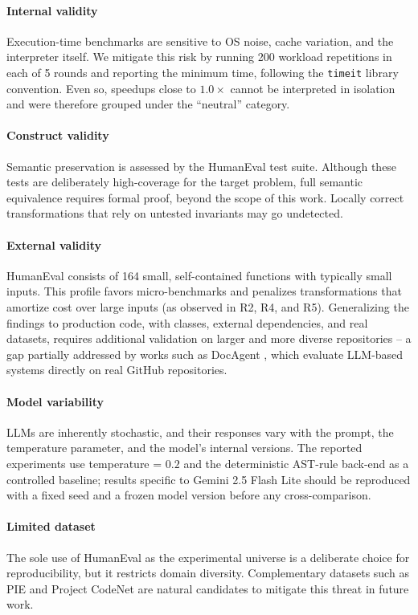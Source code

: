 \documentclass[conference]{IEEEtran}
\begin{document}
\paragraph{Internal validity} Execution-time benchmarks are sensitive to OS noise, cache variation, and the interpreter itself. We mitigate this risk by running 200 workload repetitions in each of 5 rounds and reporting the minimum time, following the \texttt{timeit} library convention. Even so, speedups close to $1.0\times$ cannot be interpreted in isolation and were therefore grouped under the ``neutral'' category.

\paragraph{Construct validity} Semantic preservation is assessed by the HumanEval test suite. Although these tests are deliberately high-coverage for the target problem, full semantic equivalence requires formal proof, beyond the scope of this work. Locally correct transformations that rely on untested invariants may go undetected.

\paragraph{External validity} HumanEval consists of 164 small, self-contained functions with typically small inputs. This profile favors micro-benchmarks and penalizes transformations that amortize cost over large inputs (as observed in R2, R4, and R5). Generalizing the findings to production code, with classes, external dependencies, and real datasets, requires additional validation on larger and more diverse repositories -- a gap partially addressed by works such as DocAgent \cite{DBLP:journals/corr/abs-2504-08725}, which evaluate LLM-based systems directly on real GitHub repositories.

\paragraph{Model variability} LLMs are inherently stochastic, and their responses vary with the prompt, the temperature parameter, and the model's internal versions. The reported experiments use temperature = $0.2$ and the deterministic AST-rule back-end as a controlled baseline; results specific to Gemini 2.5 Flash Lite should be reproduced with a fixed seed and a frozen model version before any cross-comparison.

\paragraph{Limited dataset} The sole use of HumanEval as the experimental universe is a deliberate choice for reproducibility, but it restricts domain diversity. Complementary datasets such as PIE \cite{DBLP:journals/corr/abs-2302-07867} and Project CodeNet \cite{DBLP:journals/corr/abs-2105-12655} are natural candidates to mitigate this threat in future work.
\end{document}
